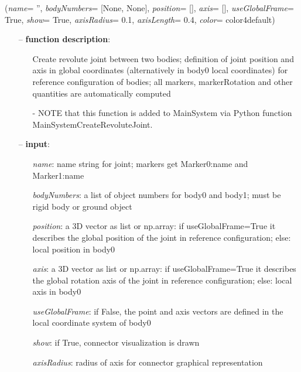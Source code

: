 %
\begin{flushleft}
\label{sec:mainsystemextensions:CreateRevoluteJoint}
({\it name}= '', {\it bodyNumbers}= [None, None], {\it position}= [], {\it axis}= [], {\it useGlobalFrame}= True, {\it show}= True, {\it axisRadius}= 0.1, {\it axisLength}= 0.4, {\it color}= color4default)
\end{flushleft}
\setlength{\itemindent}{0.7cm}
\begin{itemize}[leftmargin=0.7cm]
\item[--]
{\bf function description}: \vspace{-6pt}
\begin{itemize}[leftmargin=1.2cm]
\setlength{\itemindent}{-0.7cm}
\item[]Create revolute joint between two bodies; definition of joint position and axis in global coordinates (alternatively in body0 local coordinates) for reference configuration of bodies; all markers, markerRotation and other quantities are automatically computed
\item[]- NOTE that this function is added to MainSystem via Python function MainSystemCreateRevoluteJoint.
\end{itemize}
\item[--]
{\bf input}: \vspace{-6pt}
\begin{itemize}[leftmargin=1.2cm]
\setlength{\itemindent}{-0.7cm}
\item[]{\it name}: name string for joint; markers get Marker0:name and Marker1:name
\item[]{\it bodyNumbers}: a list of object numbers for body0 and body1; must be rigid body or ground object
\item[]{\it position}: a 3D vector as list or np.array: if useGlobalFrame=True it describes the global position of the joint in reference configuration; else: local position in body0
\item[]{\it axis}: a 3D vector as list or np.array: if  useGlobalFrame=True it describes the global rotation axis of the joint in reference configuration; else: local axis in body0
\item[]{\it useGlobalFrame}: if False, the point and axis vectors are defined in the local coordinate system of body0
\item[]{\it show}: if True, connector visualization is drawn
\item[]{\it axisRadius}: radius of axis for connector graphical representation

\end{itemize}
\end{itemize}
